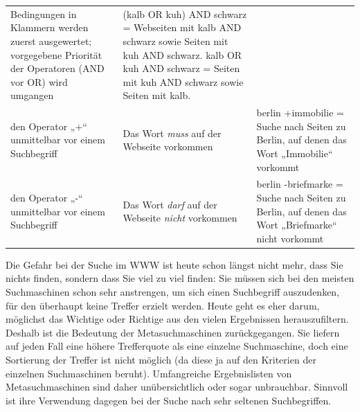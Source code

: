 \documentclass[]{book}
\theoremstyle{definition}
\theoremstyle{definition}
\theoremstyle{definition}
\theoremstyle{remark}
\begin{document}
\begin{longtable}[]{@{}lll@{}}
\begin{minipage}[t]{0.27\columnwidth}
Bedingungen in Klammern werden zuerst ausgewertet; vorgegebene Priorität
der Operatoren (AND vor OR) wird umgangen \vspace{5mm}\strut
\end{minipage} & \begin{minipage}[t]{0.33\columnwidth}\raggedright\strut
(kalb OR kuh) AND schwarz = Webseiten mit kalb AND schwarz sowie Seiten
mit kuh AND schwarz. kalb OR kuh AND schwarz = Seiten mit kuh AND
schwarz sowie Seiten mit kalb. \vspace{5mm}\strut
\end{minipage}\tabularnewline
\begin{minipage}[t]{0.31\columnwidth}\raggedright\strut
den Operator „+`` unmittelbar vor einem Suchbegriff \vspace{5mm}\strut
\end{minipage} & \begin{minipage}[t]{0.27\columnwidth}\raggedright\strut
Das Wort \emph{muss} auf der Webseite vorkommen \vspace{5mm}\strut
\end{minipage} & \begin{minipage}[t]{0.33\columnwidth}\raggedright\strut
berlin +immobilie = Suche nach Seiten zu Berlin, auf denen das Wort
„Immobilie`` vorkommt \vspace{5mm}\strut
\end{minipage}\tabularnewline
\begin{minipage}[t]{0.31\columnwidth}\raggedright\strut
den Operator „-`` unmittelbar vor einem Suchbegriff \vspace{5mm}\strut
\end{minipage} & \begin{minipage}[t]{0.27\columnwidth}\raggedright\strut
Das Wort \emph{darf} auf der Webseite \emph{nicht} vorkommen
\vspace{5mm}\strut
\end{minipage} & \begin{minipage}[t]{0.33\columnwidth}\raggedright\strut
berlin -briefmarke = Suche nach Seiten zu Berlin, auf denen das Wort
„Briefmarke`` nicht vorkommt \vspace{5mm}\strut
\end{minipage}\tabularnewline
\bottomrule
\end{longtable}

Die Gefahr bei der Suche im WWW ist heute schon längst nicht mehr, dass
Sie nichts finden, sondern dass Sie viel zu viel finden: Sie müssen sich
bei den meisten Suchmaschinen schon sehr anstrengen, um sich einen
Suchbegriff auszudenken, für den überhaupt keine Treffer erzielt werden.
Heute geht es eher darum, möglichst das Wichtige oder Richtige aus den
vielen Ergebnissen herauszufiltern. Deshalb ist die Bedeutung der
Metasuchmaschinen zurückgegangen. Sie liefern auf jeden Fall eine höhere
Trefferquote als eine einzelne Suchmaschine, doch eine Sortierung der
Treffer ist nicht möglich (da diese ja auf den Kriterien der einzelnen
Suchmaschinen beruht). Umfangreiche Ergebnislisten von Metasuchmaschinen
sind daher unübersichtlich oder sogar unbrauchbar. Sinnvoll ist ihre
Verwendung dagegen bei der Suche nach sehr seltenen Suchbegriffen.
\end{document}
